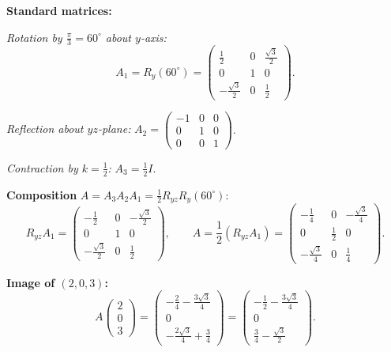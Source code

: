 \documentclass[12pt,a3paper]{article}
\begin{document}
\begin{tcolorbox}[enhanced,breakable,
  colback=cF!4,colframe=cF,boxrule=0.8pt,arc=5pt,
  title={\textbf{Answer --- Composition: Rot$(\frac{\pi}{3},y)$ $\to$ Reflect$(yz)$ $\to$ Contract$(\frac{1}{2})$; Image of $(2,0,3)$}},
  fonttitle=\bfseries\color{white},colbacktitle=cF]

\textbf{Standard matrices:}

\textit{Rotation by $\frac{\pi}{3}=60^\circ$ about $y$-axis:}
\[
A_1=R_y(60^\circ)=\begin{pmatrix}\frac{1}{2}&0&\frac{\sqrt{3}}{2}\\0&1&0\\-\frac{\sqrt{3}}{2}&0&\frac{1}{2}\end{pmatrix}.
\]

\textit{Reflection about $yz$-plane:} $A_2=\begin{pmatrix}-1&0&0\\0&1&0\\0&0&1\end{pmatrix}$.

\textit{Contraction by $k=\frac{1}{2}$:} $A_3=\frac{1}{2}I$.

\textbf{Composition} $A=A_3A_2A_1=\frac{1}{2}R_{yz}R_y(60^\circ)$:
\[
R_{yz}A_1=\begin{pmatrix}-\frac{1}{2}&0&-\frac{\sqrt{3}}{2}\\0&1&0\\-\frac{\sqrt{3}}{2}&0&\frac{1}{2}\end{pmatrix},\qquad
A=\frac{1}{2}(R_{yz}A_1)=\begin{pmatrix}-\frac{1}{4}&0&-\frac{\sqrt{3}}{4}\\0&\frac{1}{2}&0\\-\frac{\sqrt{3}}{4}&0&\frac{1}{4}\end{pmatrix}.
\]

\textbf{Image of $(2,0,3)$:}
\[
A\begin{pmatrix}2\\0\\3\end{pmatrix}=\begin{pmatrix}-\frac{2}{4}-\frac{3\sqrt{3}}{4}\\0\\-\frac{2\sqrt{3}}{4}+\frac{3}{4}\end{pmatrix}=\boxed{\begin{pmatrix}-\frac{1}{2}-\frac{3\sqrt{3}}{4}\\[4pt]0\\[4pt]\frac{3}{4}-\frac{\sqrt{3}}{2}\end{pmatrix}}.
\]

\end{tcolorbox}
\end{document}

